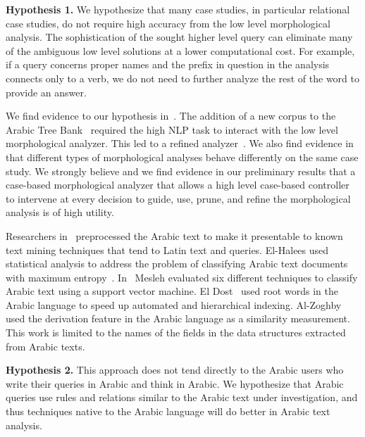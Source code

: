 \documentclass[12pt]{article}
\begin{document}
{\bf Hypothesis 1.} We hypothesize that many case studies, in particular relational
case studies, do not require high accuracy from the 
low level morphological analysis.
The sophistication of the sought higher level query can eliminate 
many of the ambiguous low level solutions at a lower computational 
cost.
For example, if a query concerns proper names and the 
prefix in question in the analysis connects only to a verb, 
we do not need to further analyze the rest of the word 
to provide an answer.

We find evidence to our hypothesis in~\cite{Maamouri:10}. The 
addition of a new corpus to the Arabic Tree Bank~\cite{Maamouri:04}
required the high NLP task to interact with the low 
level morphological analyzer.
This led to a refined analyzer~\cite{Kulick:10}.  
We also find evidence in~\cite{Habash:06} that different types of 
morphological analyses behave differently on the same case study. 
We strongly believe and we find evidence in our preliminary
results that a 
case-based morphological analyzer that allows a high level 
case-based controller to intervene at every decision to 
guide, use, prune, and refine the morphological analysis
is of high utility.

Researchers in~\cite{AEL07,Ham07,Abd07,MEl03} 
preprocessed the Arabic text to make it presentable to known text 
mining techniques that tend to Latin text and queries.
El-Halees used statistical analysis to address the problem of 
classifying Arabic text documents with maximum 
entropy~\cite{AEL07}.
In~\cite{Abd07} Mesleh evaluated six different techniques to 
classify Arabic text using a support vector machine.
El Dost~\cite{MEl03} used root words in the Arabic language to 
speed up automated and hierarchical indexing.
Al-Zoghby~\cite{Ham07}
used the derivation feature in 
the Arabic language as a similarity measurement.
This work is limited to the names of the fields in the data 
structures extracted from Arabic texts.

{\bf Hypothesis 2.} This approach does not tend directly to 
the Arabic users who write their 
queries in Arabic and think in Arabic.
We hypothesize that Arabic queries use rules and 
relations similar to the Arabic text under investigation, 
and thus techniques native to the Arabic language will do better 
in Arabic text analysis.
\end{document}
